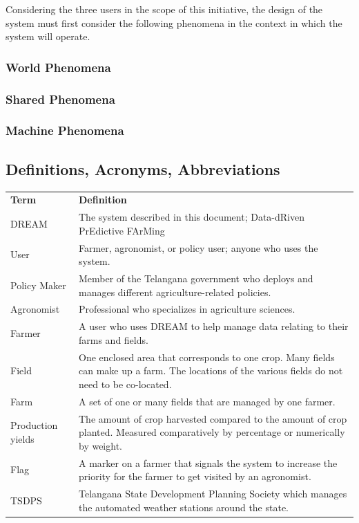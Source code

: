 \begin{flushleft} 
Considering the three users in the scope of this initiative, the design of the system must first consider the following phenomena in the context in which the system will operate.  

\subsubsection{World Phenomena}

\subsubsection{Shared Phenomena}

\subsubsection{Machine Phenomena}

\end{flushleft}

\subsection{Definitions, Acronyms, Abbreviations}


\begin{center}
\renewcommand{\arraystretch}{1.25}
\begin{tabular}{l >{\raggedright\arraybackslash}p{12cm} } \hline
    \textbf{Term} & \textbf{Definition}\\ 
    DREAM & The system described in this document; Data-dRiven PrEdictive FArMing\\
    User & Farmer, agronomist, or policy user; anyone who uses the system.\\
	Policy Maker & Member of the Telangana government who deploys and manages different agriculture-related policies. \\
	Agronomist & Professional who specializes in agriculture sciences. \\
    Farmer & A user who uses DREAM to help manage data relating to their farms and fields.\\
    Field & One enclosed area that corresponds to one crop. Many fields can make up a farm. The locations of the various fields do not need to be co-located.\\
    Farm & A set of one or many fields that are managed by one farmer.\\
    Production yields & The amount of crop harvested compared to the amount of crop planted. Measured comparatively by percentage or numerically by weight.\\
    Flag & A marker on a farmer that signals the system to increase the priority for the farmer to get visited by an agronomist.\\
    TSDPS & Telangana State Development Planning Society which manages the automated weather stations around the state. \\
    \hline
\end{tabular}
\end{center}

